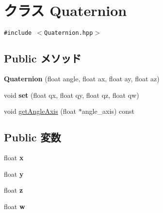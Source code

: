 \hypertarget{classm3g_1_1Quaternion}{
\section{クラス Quaternion}
\label{classm3g_1_1Quaternion}
}
{\tt \#include $<$Quaternion.hpp$>$}

\subsection*{Public メソッド}
\begin{CompactItemize}
\item 
\hypertarget{classm3g_1_1Quaternion_7a06a28b864e525f73a1bb0eb3e9274e}{
\textbf{Quaternion} (float angle, float ax, float ay, float az)}
\label{classm3g_1_1Quaternion_7a06a28b864e525f73a1bb0eb3e9274e}

\item 
\hypertarget{classm3g_1_1Quaternion_0712dc357557a30ac0da0a9d4cdd278c}{
void \textbf{set} (float qx, float qy, float qz, float qw)}
\label{classm3g_1_1Quaternion_0712dc357557a30ac0da0a9d4cdd278c}

\item 
void \hyperlink{classm3g_1_1Quaternion_3049675269aef6bb333d8f83fdf6eed7}{getAngleAxis} (float $\ast$angle\_\-axis) const 
\end{CompactItemize}
\subsection*{Public 変数}
\begin{CompactItemize}
\item 
\hypertarget{classm3g_1_1Quaternion_d0da36b2558901e21e7a30f6c227a45e}{
float \textbf{x}}
\label{classm3g_1_1Quaternion_d0da36b2558901e21e7a30f6c227a45e}

\item 
\hypertarget{classm3g_1_1Quaternion_a4f0d3eebc3c443f9be81bf48561a217}{
float \textbf{y}}
\label{classm3g_1_1Quaternion_a4f0d3eebc3c443f9be81bf48561a217}

\item 
\hypertarget{classm3g_1_1Quaternion_f73583b1e980b0aa03f9884812e9fd4d}{
float \textbf{z}}
\label{classm3g_1_1Quaternion_f73583b1e980b0aa03f9884812e9fd4d}

\item 
\hypertarget{classm3g_1_1Quaternion_56eca241e2896b9f57a79589e76fd24b}{
float \textbf{w}}
\label{classm3g_1_1Quaternion_56eca241e2896b9f57a79589e76fd24b}

\end{CompactItemize}


